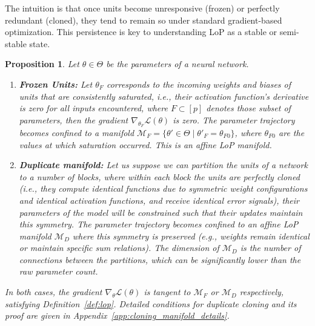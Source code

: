 \documentclass{article}
\newcommand{\Loss}{\mathcal{L}}
\newcommand{\GIU}[1]{\todo[color=purple!30,size=\tiny]{GIU: #1}}
\newtheorem{proposition}{Proposition}[section]
\newtheorem{remark}{Remark}[section]
\numberwithin{figure}{section}
\begin{document}
The intuition is that once units become unresponsive (frozen) or perfectly redundant (cloned), they tend to remain so under standard gradient-based optimization. This persistence is key to understanding LoP as a stable or semi-stable state.
\begin{proposition}
\label{prop:frozen_duplicate_lop}
Let $\theta \in \Theta$ be the parameters of a neural network.
\begin{enumerate}
    \item \textbf{Frozen Units:} Let $\theta_F$ corresponds to the incoming weights and biases of units that are consistently saturated, i.e., their activation function's derivative is zero for all inputs encountered, where $F \subset [p]$ denotes those subset of parameters, then the gradient $\nabla_{\theta_F} \Loss(\theta)$ is zero. The parameter trajectory becomes confined to a manifold $\mathcal{M}_F = \{ \theta' \in \Theta \mid \theta'_F = \theta_{F0} \}$, where $\theta_{F0}$ are the values at which saturation occurred. This is an affine LoP manifold.

    \item \textbf{Duplicate manifold:} Let us suppose we can partition the units of a network to a number of blocks, where within each block the units are perfectly cloned (i.e., they compute identical functions due to symmetric weight configurations and identical activation functions, and receive identical error signals), their  parameters of the model will be constrained such that their updates maintain this symmetry. The parameter trajectory becomes confined to an affine LoP manifold $\mathcal{M}_D$ where this symmetry is preserved (e.g., weights remain identical or maintain specific sum relations). The dimension of $\mathcal{M}_D$ is the number of connections between the partitions, which can be significantly lower than the raw parameter count.
\end{enumerate}
In both cases, the gradient $\nabla_\theta \Loss(\theta)$ is tangent to $\mathcal{M}_F$ or $\mathcal{M}_D$ respectively, satisfying Definition~\ref{def:lop}.
% 
Detailed conditions for duplicate cloning and its proof are given in  Appendix~\ref{app:cloning_manifold_details}. 
\end{proposition}

\end{document}
